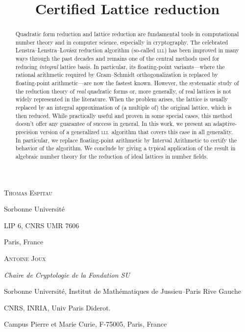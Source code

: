 \documentclass{amsart}
\title[Certified Lattice reduction]
      {Certified Lattice reduction}
\author[Thomas Espitau and Antoine Joux]{}
\newcommand{\LLL}{\mbox{\textsc{lll}}}
\theoremstyle{definition}
\begin{document}
\maketitle

\centerline{\scshape Thomas Espitau}
\medskip
{\footnotesize
 \centerline{Sorbonne Universit\'e}
   \centerline{LIP 6, CNRS UMR 7606}
   \centerline{Paris, France}
}

\medskip

\centerline{\scshape Antoine Joux}
\medskip
{\footnotesize
  \centerline{\it Chaire de Cryptologie de la Fondation SU}
  \centerline{Sorbonne Universit\'e, Institut de Math\'ematiques de
  Jussieu--Paris Rive Gauche}
  \centerline{CNRS, INRIA, Univ Paris Diderot.}
  \centerline{Campus Pierre et Marie Curie, F-75005, Paris, France}
}



\begin{abstract}
Quadratic form reduction and lattice reduction are fundamental tools
  in computational number theory and in computer science, especially
  in cryptography.  The celebrated Lenstra--Lenstra--Lovász reduction
  algorithm (so-called \LLL) has been improved in many ways through
  the past decades and remains one of the central methods used for
  reducing \emph{integral} lattice basis. In particular, its
  floating-point variants---where the rational arithmetic required by
  Gram--Schmidt orthogonalization is replaced by floating-point
  arithmetic---are now the fastest known. However, the systematic
  study of the reduction theory of \emph{real} quadratic forms or, more
  generally, of real lattices is not widely represented in the
  literature. When the problem arises, the lattice is usually replaced
  by an integral approximation of  (a multiple of) the original
  lattice, which is then reduced. While practically useful and proven
  in some special cases, this method doesn't offer any guarantee of
  success in general.  In this work, we present an adaptive-precision
  version of a generalized \LLL~algorithm that covers this case in all
  generality. In particular, we replace floating-point arithmetic by
  Interval Arithmetic to certify the behavior of the algorithm. We
  conclude by giving a typical application of the result in algebraic
  number theory for the reduction of ideal lattices in number fields.
\end{abstract}
\end{document}
